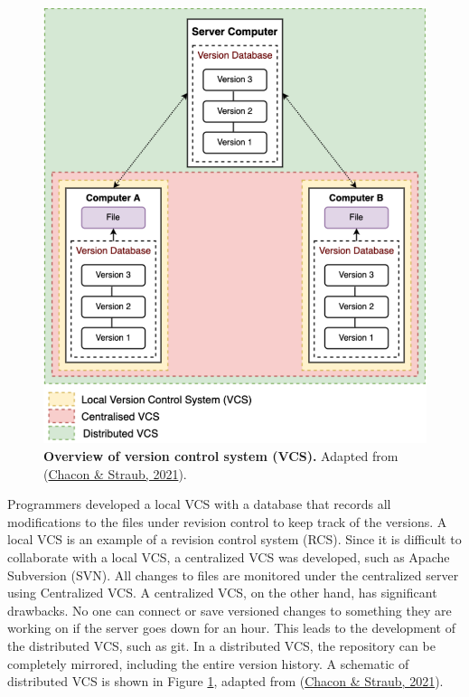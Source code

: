 \documentclass[12pt,twoside]{reedthesis}
\begin{document}
\begin{figure}[h]

{\centering \includegraphics{thesis_files/figure-latex/mf1-1} 

}

\caption[Overview of version control system]{\textbf{Overview of version control system (VCS).} Adapted from (\protect\hyperlink{ref-chacon2021}{Chacon \& Straub, 2021}).}\label{fig:mf1}
\end{figure}
Programmers developed a local VCS with a database that records all
modifications to the files under revision control to keep track of the
versions. A local VCS is an example of a revision control system (RCS).
Since it is difficult to collaborate with a local VCS, a centralized VCS
was developed, such as Apache Subversion (SVN). All changes to files are
monitored under the centralized server using Centralized VCS. A
centralized VCS, on the other hand, has significant drawbacks. No one
can connect or save versioned changes to something they are working on
if the server goes down for an hour. This leads to the development of
the distributed VCS, such as git. In a distributed VCS, the repository
can be completely mirrored, including the entire version history. A
schematic of distributed VCS is shown in Figure \ref{fig:mf1}, adapted from
(\protect\hyperlink{ref-chacon2021}{Chacon \& Straub, 2021}).
\end{document}
